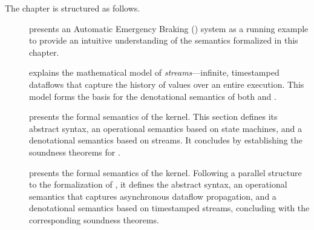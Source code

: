The chapter is structured as follows.
\begin{description}
      \item[]
            presents an Automatic Emergency Braking (\aeb) system as a running example to provide an
            intuitive understanding of the \GRust semantics formalized in this chapter.

      \item[]
            explains the mathematical model of \emph{streams}---infinite, timestamped dataflows that
            capture the history of values over an entire execution. This model forms the basis for
            the denotational semantics of both \GRSync and \GRFRP.

      \item[]
            presents the formal semantics of the \GRSync kernel. This section defines its abstract
            syntax, an operational semantics based on state machines, and a denotational semantics
            based on streams. It concludes by establishing the soundness theorems for \GRSync.

      \item[]
            presents the formal semantics of the \GRFRP kernel. Following a parallel structure to
            the formalization of \GRSync, it defines the abstract syntax, an operational semantics
            that captures asynchronous dataflow propagation, and a denotational semantics based on
            timestamped streams, concluding with the corresponding soundness theorems.
\end{description}

